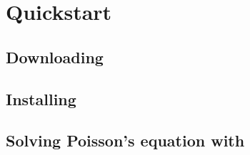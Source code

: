 \chapter{Quickstart}

\section{Downloading \dolfin{}}

\section{Installing \dolfin{}}

\section{Solving Poisson's equation with \dolfin{}}
